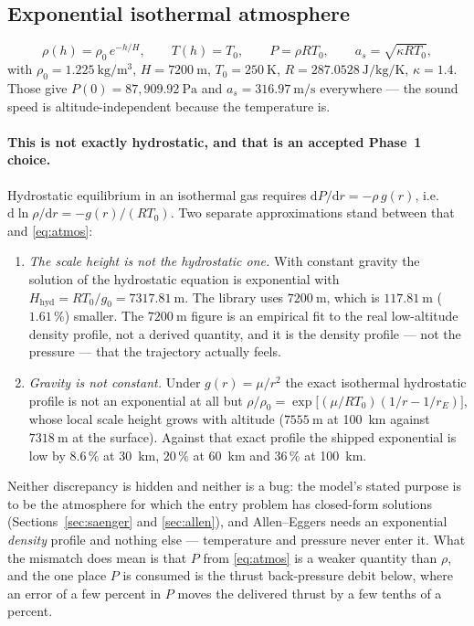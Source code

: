 \documentclass[11pt]{article}
\newcommand{\dd}{\mathrm{d}}
\begin{document}
\subsection{Exponential isothermal atmosphere}

\begin{equation}
  \rho(h) = \rho_0\,e^{-h/H}, \qquad
  T(h) = T_0, \qquad
  P = \rho R T_0, \qquad
  a_s = \sqrt{\kappa R T_0},
  \label{eq:atmos}
\end{equation}
with $\rho_0 = 1.225~\mathrm{kg/m^3}$, $H = 7200~\mathrm{m}$,
$T_0 = 250~\mathrm{K}$, $R = 287.0528~\mathrm{J/kg/K}$, $\kappa = 1.4$. Those
give $P(0) = 87{,}909.92~\mathrm{Pa}$ and $a_s = 316.97~\mathrm{m/s}$
everywhere --- the sound speed is altitude-independent because the temperature
is.

\paragraph{This is not exactly hydrostatic, and that is an accepted Phase~1
choice.} Hydrostatic equilibrium in an isothermal gas requires
$\dd P/\dd r = -\rho\,g(r)$, i.e.\ $\dd\ln\rho/\dd r = -g(r)/(RT_0)$. Two
separate approximations stand between that and \eqref{eq:atmos}:

\begin{enumerate}
\item \emph{The scale height is not the hydrostatic one.} With constant gravity
the solution of the hydrostatic equation is exponential with
$H_{\text{hyd}} = RT_0/g_0 = 7317.81~\mathrm{m}$. The library uses
$7200~\mathrm{m}$, which is $117.81~\mathrm{m}$ ($1.61\,\%$) smaller. The
$7200~\mathrm{m}$ figure is an empirical fit to the real low-altitude density
profile, not a derived quantity, and it is the density profile --- not the
pressure --- that the trajectory actually feels.
\item \emph{Gravity is not constant.} Under $g(r)=\mu/r^2$ the exact isothermal
hydrostatic profile is not an exponential at all but
$\rho/\rho_0 = \exp\bigl[(\mu/RT_0)(1/r - 1/r_E)\bigr]$, whose local scale
height grows with altitude ($7555~\mathrm{m}$ at 100~km against
$7318~\mathrm{m}$ at the surface). Against that exact profile the shipped
exponential is low by $8.6\,\%$ at 30~km, $20\,\%$ at 60~km and $36\,\%$ at
100~km.
\end{enumerate}

Neither discrepancy is hidden and neither is a bug: the model's stated purpose
is to be the atmosphere for which the entry problem has closed-form solutions
(Sections~\ref{sec:saenger} and \ref{sec:allen}), and Allen--Eggers needs an
exponential \emph{density} profile and nothing else --- temperature and
pressure never enter it. What the mismatch does mean is that $P$ from
\eqref{eq:atmos} is a weaker quantity than $\rho$, and the one place $P$ is
consumed is the thrust back-pressure debit below, where an error of a few
percent in $P$ moves the delivered thrust by a few tenths of a percent.
\end{document}
